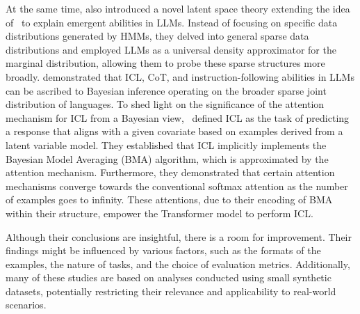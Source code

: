 At the same time, \citet{Jiang2023ALS} also introduced a novel latent space theory extending the idea of~\citet{Xie2021AnEO} to explain emergent abilities in LLMs.
Instead of focusing on specific data distributions generated by HMMs, they delved into general sparse data distributions and employed LLMs as a universal density approximator for the marginal distribution, allowing them to probe these sparse structures more broadly.
\citet{Jiang2023ALS} demonstrated that ICL, CoT, and instruction-following abilities in LLMs can be ascribed to Bayesian inference operating on the broader sparse joint distribution of languages.
To shed light on the significance of the attention mechanism for ICL from a Bayesian view,~\citet{Zhang2023WhatAH} defined ICL as the task of predicting a response that aligns with a given covariate based on examples derived from a latent variable model. 
They established that ICL implicitly implements the Bayesian Model Averaging (BMA) algorithm, which is approximated by the attention mechanism.
Furthermore, they demonstrated that certain attention mechanisms converge towards the conventional softmax attention as the number of examples goes to infinity. 
These attentions, due to their encoding of BMA within their structure, empower the Transformer model to perform ICL.

Although their conclusions are insightful, there is a room for improvement.
Their findings might be influenced by various factors, such as the formats of the  examples, the nature of tasks, and the choice of evaluation metrics. 
Additionally, many of these studies are based on analyses conducted using small synthetic datasets, potentially restricting their relevance and applicability to real-world scenarios.
